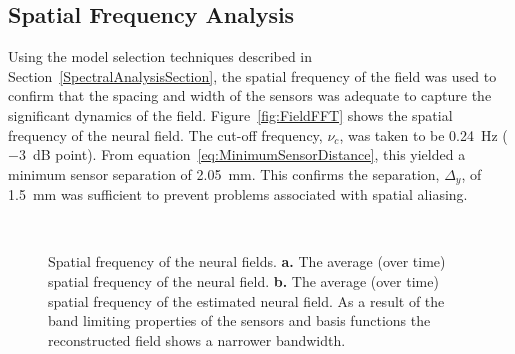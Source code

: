 \documentclass[10pt,a4paper]{article}
\begin{document}
\subsection{Spatial Frequency Analysis} 
Using the model selection techniques described in Section~\ref{SpectralAnalysisSection}, the spatial frequency of the field was used to confirm that the spacing and width of the sensors was adequate to capture the significant dynamics of the field. Figure~\ref{fig:FieldFFT} shows the spatial frequency of the neural field. The cut-off frequency, $\nu_c$, was taken to be 0.24~Hz ($-3$~dB point). From equation~\ref{eq:MinimumSensorDistance}, this yielded a minimum sensor separation of 2.05~mm. This confirms the separation, $\Delta_{y}$, of 1.5~mm was sufficient to prevent problems associated with spatial aliasing.
\begin{figure}
\centering
{}
\\
\caption{Spatial frequency of the neural fields. \textbf{a.} The average (over time) spatial frequency of the neural field. \textbf{b.} The average (over time) spatial frequency of the estimated neural field. As a result of the band limiting properties of the sensors and basis functions the reconstructed field shows a narrower bandwidth.}
\label{fig:FFTTrueEstimate}
\end{figure}
\end{document}
